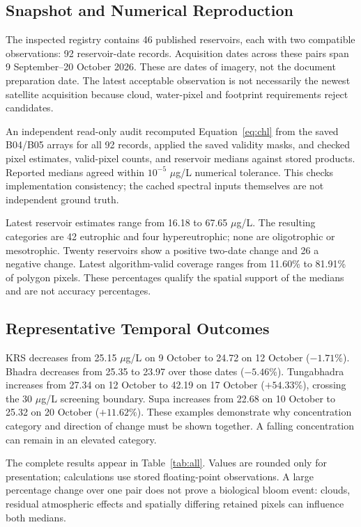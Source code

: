 \documentclass[conference]{IEEEtran}
\begin{document}
\subsection{Snapshot and Numerical Reproduction}
The inspected registry contains 46 published reservoirs, each with two compatible observations: 92 reservoir-date records. Acquisition dates across these pairs span 9 September--20 October 2026. These are dates of imagery, not the document preparation date. The latest acceptable observation is not necessarily the newest satellite acquisition because cloud, water-pixel and footprint requirements reject candidates.

An independent read-only audit recomputed Equation~\eqref{eq:chl} from the saved B04/B05 arrays for all 92 records, applied the saved validity masks, and checked pixel estimates, valid-pixel counts, and reservoir medians against stored products. Reported medians agreed within $10^{-5}$ $\mu$g/L numerical tolerance. This checks implementation consistency; the cached spectral inputs themselves are not independent ground truth.

Latest reservoir estimates range from 16.18 to 67.65 $\mu$g/L. The resulting categories are 42 eutrophic and four hypereutrophic; none are oligotrophic or mesotrophic. Twenty reservoirs show a positive two-date change and 26 a negative change. Latest algorithm-valid coverage ranges from 11.60\% to 81.91\% of polygon pixels. These percentages qualify the spatial support of the medians and are not accuracy percentages.

\subsection{Representative Temporal Outcomes}
KRS decreases from 25.15 $\mu$g/L on 9 October to 24.72 on 12 October ($-1.71$\%). Bhadra decreases from 25.35 to 23.97 over those dates ($-5.46$\%). Tungabhadra increases from 27.34 on 12 October to 42.19 on 17 October ($+54.33$\%), crossing the 30 $\mu$g/L screening boundary. Supa increases from 22.68 on 10 October to 25.32 on 20 October ($+11.62$\%). These examples demonstrate why concentration category and direction of change must be shown together. A falling concentration can remain in an elevated category.

The complete results appear in Table~\ref{tab:all}. Values are rounded only for presentation; calculations use stored floating-point observations. A large percentage change over one pair does not prove a biological bloom event: clouds, residual atmospheric effects and spatially differing retained pixels can influence both medians.
\end{document}
